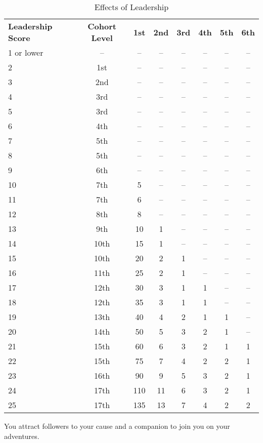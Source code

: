 \begin{table}[htb]
\sffamily
{}
\caption{Effects of Leadership}
\centering
\begin{tabular}{l c *{6}{c}}
\textbf{Leadership Score} & \textbf{Cohort Level} & \textbf{1st} & \textbf{2nd} & \textbf{3rd} & \textbf{4th} & \textbf{5th} & \textbf{6th}\\
1 or lower & -- & -- & -- & -- & -- & -- & --\\
2 & 1st & -- & -- & -- & -- & -- & --\\
3 & 2nd & -- & -- & -- & -- & -- & --\\
4 & 3rd & -- & -- & -- & -- & -- & --\\
5 & 3rd & -- & -- & -- & -- & -- & --\\
6 & 4th & -- & -- & -- & -- & -- & --\\
7 & 5th & -- & -- & -- & -- & -- & --\\
8 & 5th & -- & -- & -- & -- & -- & --\\
9 & 6th & -- & -- & -- & -- & -- & --\\
10 & 7th & 5 & -- & -- & -- & -- & --\\
11 & 7th & 6 & -- & -- & -- & -- & --\\
12 & 8th & 8 & -- & -- & -- & -- & --\\
13 & 9th & 10 & 1 & -- & -- & -- & --\\
14 & 10th & 15 & 1 & -- & -- & -- & --\\
15 & 10th & 20 & 2 & 1 & -- & -- & --\\
16 & 11th & 25 & 2 & 1 & -- & -- & --\\
17 & 12th & 30 & 3 & 1 & 1 & -- & --\\
18 & 12th & 35 & 3 & 1 & 1 & -- & --\\
19 & 13th & 40 & 4 & 2 & 1 & 1 & --\\
20 & 14th & 50 & 5 & 3 & 2 & 1 & --\\
21 & 15th & 60 & 6 & 3 & 2 & 1 & 1\\
22 & 15th & 75 & 7 & 4 & 2 & 2 & 1\\
23 & 16th & 90 & 9 & 5 & 3 & 2 & 1\\
24 & 17th & 110 & 11 & 6 & 3 & 2 & 1\\
25 & 17th & 135 & 13 & 7 & 4 & 2 & 2\\
\end{tabular}
\end{table}



				
You attract followers to your cause and a companion to join you on your adventures.
				
